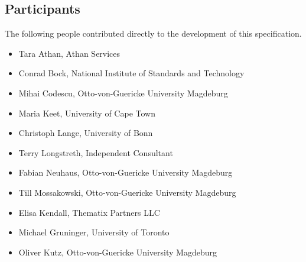 \documentclass[10pt,%
\ifpretendfinal
final%
\else
draft%
\fi,
]{scrreprt}
\begin{document}
\subsection{Participants}
The following people contributed directly to the development of this specification. 
	\begin{itemize}
	\item Tara Athan, Athan Services 
	\item Conrad Bock, National Institute of Standards and Technology  
	\item Mihai Codescu, Otto-von-Guericke University Magdeburg 
	\item Maria Keet, University of Cape Town 
	\item Christoph Lange, University of Bonn 
	\item Terry Longstreth, Independent Consultant 	
	\item Fabian Neuhaus, Otto-von-Guericke University Magdeburg  
	\item Till Mossakowski, Otto-von-Guericke University Magdeburg  	
	\item Elisa Kendall,  Thematix Partners LLC
	\item Michael Gruninger, University of Toronto  
	\item Oliver Kutz, Otto-von-Guericke University Magdeburg  
	\end{itemize}
%	
%
\end{document}

